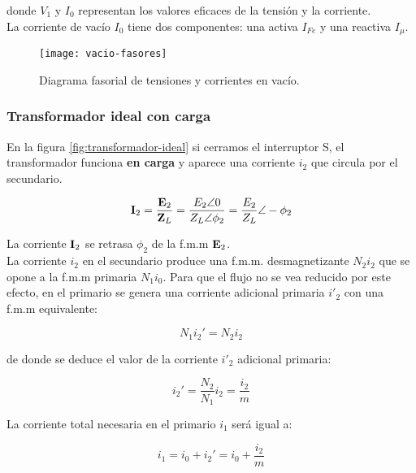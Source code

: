 donde $V_{1}$ y $I_{0}$ representan los valores eficaces de la tensión y la corriente.\\

La corriente de vacío $I_{0}$ tiene dos componentes: una activa $I_{Fe}$ y una reactiva $I_{\mu}$.

 \begin{figure}[!htbp]
	\centering
	\texttt{[image: vacio-fasores]}
	\caption{Diagrama fasorial de tensiones y corrientes en vacío.}
	\label{diag:vacio}
\end{figure} 

\subsubsection{Transformador ideal con carga}

En la figura \ref{fig:transformador-ideal} si cerramos el interruptor S, el transformador funciona \textbf{en carga} y aparece una corriente $i_{2}$ que circula por el secundario.

\begin{equation*}
	\fasor{I}_2 = \dfrac{\fasor{e}_2}{\fasor{Z}_L} = \dfrac{E_2 \angle 0}{Z_L \angle \phi_2} = \dfrac{E_2}{Z_L} \angle -\phi_2
\end{equation*}

La corriente $\fasor{i}_2$ se retrasa $\phi_{2}$ de la f.m.m $\fasor{e}_2$. \\


La corriente $i_{2}$ en el secundario produce una f.m.m. desmagnetizante $N_{2}i_{2}$ que se opone a la f.m.m primaria $N_{1}i_{0}$. Para que el flujo no se vea reducido por este efecto, en el primario se genera una corriente adicional primaria $i'_{2}$ con una f.m.m equivalente:

\begin{equation*}
	N_1 i_2'=N_2 i_2
\end{equation*}

de donde se deduce el valor de la corriente $i'_{2}$ adicional primaria:

\begin{equation}
	i_2' = \dfrac{N_2}{N_1} i_2 = \dfrac{i_2}{m}
\end{equation}

La corriente total necesaria en el primario $i_{1}$ será igual a:

\begin{equation*}
	i_1 = i_0 + i_2' = i_0 + \dfrac{i_2}{m}
\end{equation*}

